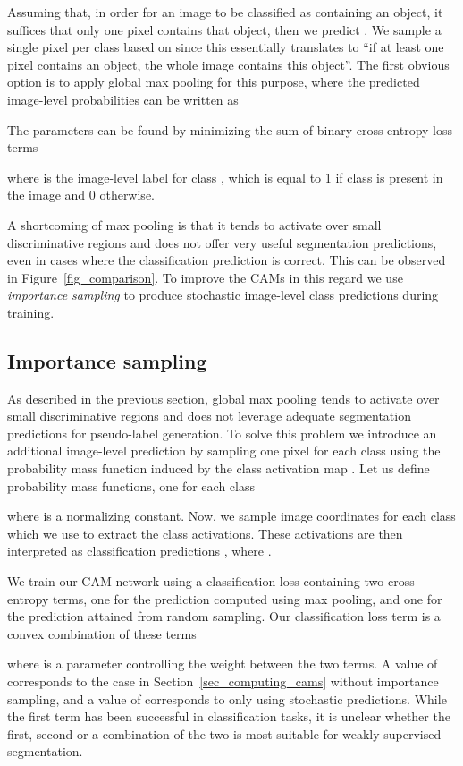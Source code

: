\documentclass{article}
\begin{document}
Assuming that, in order for an image to be classified as containing an object, it suffices that only one pixel contains that object, then we predict \mbox{}. We sample a single pixel per class based on  since this essentially translates to ``if at least one pixel contains an object, the whole image contains this object''. The first obvious option is to apply global max pooling for this purpose, where the predicted image-level probabilities  can be written as


The parameters  can be found by minimizing the sum of  binary cross-entropy loss terms

where  is the image-level label for class , which is equal to 1 if class  is present in the image and 0 otherwise.

A shortcoming of max pooling is that it tends to activate over small discriminative regions and does not offer very useful segmentation predictions, even in cases where the classification prediction is correct. This can be observed in Figure~\ref{fig_comparison}. To improve the CAMs in this regard we use \textit{importance sampling} to produce stochastic image-level class predictions during training.

\subsection{Importance sampling}
\label{sec_importance_sampling}

As described in the previous section, global max pooling tends to activate over small discriminative regions and does not leverage adequate segmentation predictions for pseudo-label generation. To solve this problem we introduce an additional image-level prediction by sampling one pixel for each class using the probability mass function induced by the class activation map . Let us define  probability mass functions, one for each class

where  is a normalizing constant. Now, we sample image coordinates for each class which we use to extract the class activations. These activations are then interpreted as classification predictions , where .

We train our CAM network using a classification loss containing two cross-entropy terms, one for the prediction  computed using max pooling, and one for the prediction  attained from random sampling. Our classification loss term is a convex combination of these terms\pagebreak

where  is a parameter controlling the weight between the two terms. A value of  corresponds to the case in Section~\ref{sec_computing_cams} without importance sampling, and a value of  corresponds to only using stochastic predictions. While the first term has been successful in classification tasks, it is unclear whether the first, second or a combination of the two is most suitable for weakly-supervised segmentation.
\end{document}
